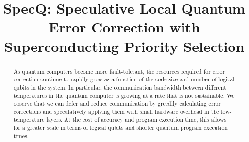 \documentclass[conference]{IEEEtran}
\title{SpecQ: Speculative Local Quantum Error Correction with Superconducting Priority Selection}
\begin{document}
\maketitle
\thispagestyle{firstpage}
\pagestyle{plain}




\begin{abstract}

  As quantum computers become more fault-tolerant, the resources required for error correction continue to rapidly grow as a function of the code size and number of logical qubits in the system. In particular, the communication bandwidth between different temperatures in the quantum computer is growing at a rate that is not sustainable. We observe that we can defer and reduce communication by greedily calculating error corrections and speculatively applying them with small hardware overhead in the low-temperature layers. At the cost of accuracy and program execution time, this allows for a greater scale in terms of logical qubits and shorter quantum program execution times.

\end{abstract}





\end{document}
